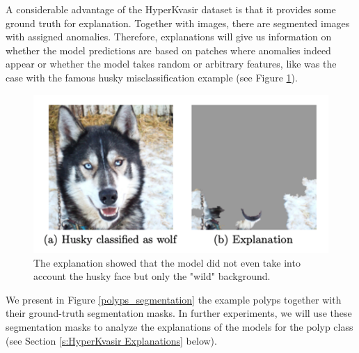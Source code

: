 \documentclass[magisterska,en]{pracamgr}
\begin{document}
A considerable advantage of the HyperKvasir dataset is that it provides some ground truth for explanation. Together with images, there are segmented images with assigned anomalies. Therefore, explanations will give us information on whether the model predictions are based on patches where anomalies indeed appear or whether the model takes random or arbitrary features, like was the case with the famous husky misclassification example (see Figure \ref{husky}).

\begin{figure}[H]
\centering
\includegraphics[scale=0.5]{./images/husky.png}
\caption{The explanation showed that the model did not even take into account the husky face but only the "wild" background.}
\label{husky}
\end{figure}


We present in Figure \ref{polyps_segmentation} the example polyps together with their ground-truth segmentation masks.
In further experiments, we will use these segmentation masks to analyze the explanations of the models for the polyp class (see Section \ref{s:HyperKvasir Explanations} below).
\end{document}

